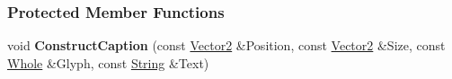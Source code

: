 \subsubsection*{Protected Member Functions}
\begin{DoxyCompactItemize}
\item 
\hypertarget{classphys_1_1UI_1_1Caption_ae1177e96a6946e76adc0774e208e9895}{
void {\bfseries ConstructCaption} (const \hyperlink{classphys_1_1Vector2}{Vector2} \&Position, const \hyperlink{classphys_1_1Vector2}{Vector2} \&Size, const \hyperlink{namespacephys_a460f6bc24c8dd347b05e0366ae34f34a}{Whole} \&Glyph, const \hyperlink{namespacephys_aa03900411993de7fbfec4789bc1d392e}{String} \&Text)}
\label{d4/dfe/classphys_1_1UI_1_1Caption_ae1177e96a6946e76adc0774e208e9895}

\end{DoxyCompactItemize}
